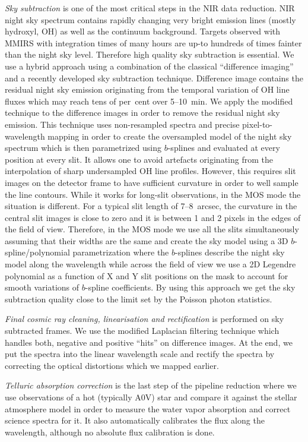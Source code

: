 \documentclass[11pt,twoside]{article}
\begin{document}
 \emph{Sky subtraction} is one of the most critical steps in the NIR data
reduction.  NIR night sky spectrum contains rapidly changing very bright
emission lines (mostly hydroxyl, OH) as well as the continuum background. 
Targets observed with MMIRS with integration times of many hours are up-to
hundreds of times fainter than the night sky level.  Therefore high quality
sky subtraction is essential.  We use a hybrid approach using a combination
of the classical ``difference imaging'' and a recently developed sky
subtraction technique.  Difference image contains the residual night sky
emission originating from the temporal variation of OH line fluxes which may
reach tens of per~cent over 5--10~min.  We apply the modified
\citet{Kelson03} technique to the difference images in order to remove the
residual night sky emission.  This technique uses non-resampled spectra and
precise pixel-to-wavelength mapping in order to create the oversampled model
of the night sky spectrum which is then parametrized using $b$-splines and
evaluated at every position at every slit.  It allows one to avoid artefacts
originating from the interpolation of sharp undersampled OH line profiles. 
However, this requires slit images on the detector frame to have sufficient
curvature in order to well sample the line contours.  While it works for
long-slit observations, in the MOS mode the situation is different.  For a
typical slit length of 7--8~arcsec, the curvature in the central slit images
is close to zero and it is between 1 and 2 pixels in the edges of the field
of view.  Therefore, in the MOS mode we use all the slits simultaneously
assuming that their widths are the same and create the sky model using a 3D
$b$-spline/polynomial parametrization where the $b$-splines describe the
night sky model along the wavelength while across the field of view we use a
2D Legendre polynomial as a function of X and Y slit positions on the mask
to account for smooth variations of $b$-spline coefficients.  By using this
approach we get the sky subtraction quality close to the limit set by the
Poisson photon statistics.

\emph{Final cosmic ray cleaning, linearisation and rectification} is
performed on sky subtracted frames.  We use the modified Laplacian filtering
technique \citep{vanDokkum01} which handles both, negative and positive
``hits'' on difference images.  At the end, we put the spectra into the
linear wavelength scale and rectify the spectra by correcting the optical
distortions which we mapped earlier.

\emph{Telluric absorption correction} is the last step of the pipeline
reduction where we use observations of a hot (typically A0V) star and
compare it against the stellar atmosphere model in order to measure the water
vapor absorption and correct science spectra for it. It also automatically
calibrates the flux along the wavelength, although no absolute flux
calibration is done.
\end{document}
